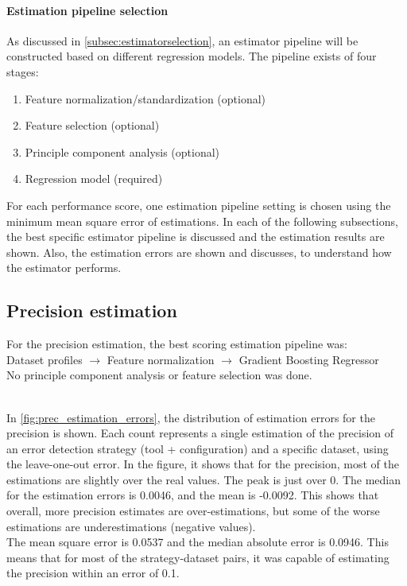 \paragraph{Estimation pipeline selection} As discussed in \autoref{subsec:estimatorselection}, an estimator pipeline will be constructed based on different regression models. The pipeline exists of four stages:
\begin{enumerate}
    \item Feature normalization/standardization (optional)
    \item Feature selection (optional)
    \item Principle component analysis (optional)
    \item Regression model (required)
\end{enumerate}

For each performance score, one estimation pipeline setting is chosen using the minimum mean square error of estimations. In each of the following subsections, the best specific estimator pipeline is discussed and the estimation results are shown. Also, the estimation errors are shown and discusses, to understand how the estimator performs.

\subsection{Precision estimation}
For the precision estimation, the best scoring estimation pipeline was:
~\\Dataset profiles $\rightarrow$ Feature normalization $\rightarrow$ Gradient Boosting Regressor
\\No principle component analysis or feature selection was done. 

~\\In \autoref{fig:prec_estimation_errors}, the distribution of estimation errors for the precision is shown. Each count represents a single estimation of the precision of an error detection strategy (tool + configuration) and a specific dataset, using the leave-one-out error. In the figure, it shows that for the precision, most of the estimations are slightly over the real values. The peak is just over 0. The median for the estimation errors is 0.0046, and the mean is -0.0092. This shows that overall, more precision estimates are over-estimations, but some of the worse estimations are underestimations (negative values). 
~\\The mean square error is 0.0537 and the median absolute error is 0.0946. This means that for most of the strategy-dataset pairs, it was capable of estimating the precision within an error of 0.1. 

